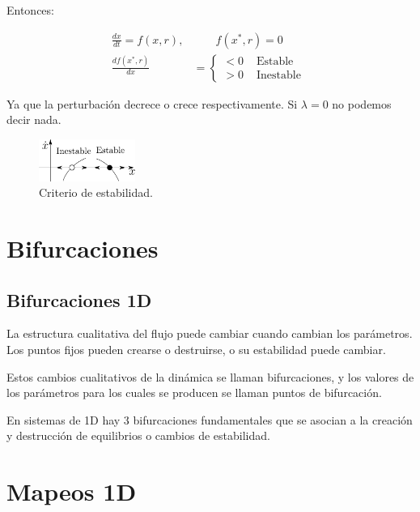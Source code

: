 \documentclass[%
 reprint,
 amsmath,amssymb,
 aps,
]{revtex4-1}
\begin{document}
Entonces:

$$
\begin{aligned}
\frac{d x}{d t}=f(x, r), & \qquad f\left(x^{*}, r\right)=0 \\
\frac{d f\left(x^{*}, r\right)}{d x} &=\left\{\begin{array}{ll}
<0 & \text { Estable } \\
>0 & \text { Inestable }
\end{array}\right.
\end{aligned}
$$

Ya que la perturbación decrece o crece respectivamente. Si $\lambda=0$ no podemos decir nada.



\begin{figure}[ht!]
  \includegraphics[width = 0.28\textwidth]{estable-Inestable.pdf}
  \caption{\label{fig:figura1} Criterio de estabilidad.}
\end{figure}

\section{Bifurcaciones}

\subsection{Bifurcaciones 1D}

La estructura cualitativa del flujo puede cambiar cuando cambian los parámetros. Los puntos fijos pueden crearse o destruirse, o su estabilidad puede cambiar.

Estos cambios cualitativos de la dinámica se llaman bifurcaciones, y los valores de los parámetros para los cuales se producen se llaman puntos de bifurcación. 

En sistemas de 1D hay 3 bifurcaciones fundamentales que se asocian a la creación y destrucción de equilibrios o cambios de estabilidad.



\section{Mapeos 1D}
\end{document}
